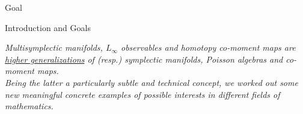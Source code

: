 \documentclass[beamer,10pt]{standalone}
\begin{document}



\begin{frame}{Goal}
		\begin{block}{Introduction and Goals}
			\vspace{0.5em}
			\centering
			\parbox{0.98\linewidth}{%
			\emph{
				{\color{lincolngreen!80!black} Multisymplectic manifolds}, 	
				{\color{norange!80!black}$L_\infty$ observables} and 
				{\color{nred!80!black}homotopy co-moment maps} are 
				\underline{higher generalizations} of (resp.)
				{\color{lincolngreen!80!black} symplectic manifolds}, 
				{\color{norange!80!black} Poisson algebras} and 
				{\color{nred!80!black}co-moment maps}. %
				\\
				Being the latter a particularly subtle and technical concept, 
				we worked out some new meaningful concrete examples of possible interests in different fields of mathematics.
			}
			}
			\vspace{.5em}
		\end{block}
\end{frame}
\end{document}
